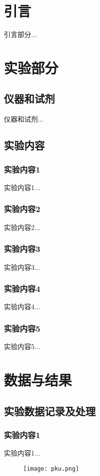 \documentclass[12pt]{article}
\begin{document}
    \section{引言}
	引言部分...
               
	\vbox{} %
	     
    \section{实验部分}
    	\subsection{仪器和试剂}
    		仪器和试剂...
    			
    	 \subsection{实验内容}
			\subsubsection{实验内容1}
				实验内容1...
			\subsubsection{实验内容2}
				实验内容2...
			\subsubsection{实验内容3}
				实验内容3...
			\subsubsection{实验内容4}
				实验内容4...
			\subsubsection{实验内容5}
				实验内容5...
    	
	\vbox{}  
	
	 \section{数据与结果}
 		\subsection{实验数据记录及处理}
 			\subsubsection{实验内容1}
 				实验内容1...
		 		 \begin{figure}[h]
		 			\centering
		 			\texttt{[image: pku.png]}
		 		\end{figure}
		 	
\end{document}
